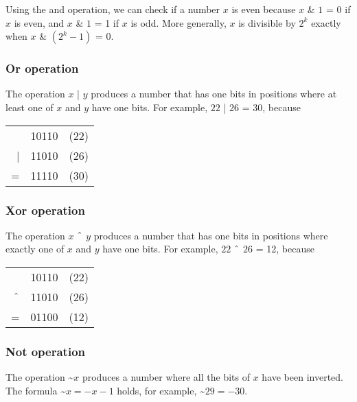 Using the and operation, we can check if a number
$x$ is even because
$x$ \& $1$ = 0 if $x$ is even, and
$x$ \& $1$ = 1 if $x$ is odd.
More generally, $x$ is divisible by $2^k$
exactly when $x$ \& $(2^k-1)$ = 0.

\subsubsection{Or operation}


The  operation $x$ | $y$ produces a number
that has one bits in positions where at least one
of $x$ and $y$ have one bits.
For example, $22$ | $26$ = 30, because

\begin{center}
\begin{tabular}{rrr}
& 10110 & (22)\\
| & 11010 & (26) \\
\hline
 = & 11110 & (30) \\
\end{tabular}
\end{center}

\subsubsection{Xor operation}


The  operation $x$ $\XOR$ $y$ produces a number
that has one bits in positions where exactly one
of $x$ and $y$ have one bits.
For example, $22$ $\XOR$ $26$ = 12, because

\begin{center}
\begin{tabular}{rrr}
& 10110 & (22)\\
$\XOR$ & 11010 & (26) \\
\hline
 = & 01100 & (12) \\
\end{tabular}
\end{center}

\subsubsection{Not operation}


The  operation \textasciitilde$x$
produces a number where all the bits of $x$
have been inverted.
The formula \textasciitilde$x = -x-1$ holds,
for example, \textasciitilde$29 = -30$.

